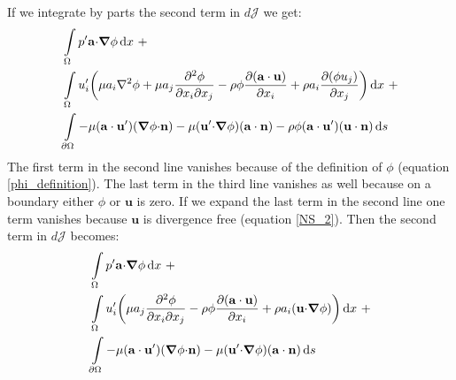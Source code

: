\documentclass[12pt, a4paper]{article}
\begin{document}
If we integrate by parts the second term in $d \mathcal{J}$ we get:
\begin{equation}
\begin{split}
&\int\limits_{\Omega}{p' \mathbf{a \cdot} \boldsymbol{\nabla} \phi} \, \mathrm{d}x \ + \\
&\int\limits_{\Omega}u'_i \bigg{(}
{\mu a_i \nabla^2 \phi} + 
{\mu a_j \frac{\partial^2 \phi}{\partial x_i \partial x_j}}  - 
{\rho \phi \frac{\partial (\mathbf{a \cdot u})}{\partial x_i}} + 
{\rho a_i \frac{\partial (\phi u_j)}{\partial x_j}}
\bigg{)}\, \mathrm{d}x \ + \\
&\int\limits_{\partial \Omega}{-\mu (\mathbf{a \cdot u'}) (\boldsymbol{\nabla} \phi \mathbf{\cdot n})} - 
{\mu (\mathbf{u' \cdot} \boldsymbol{\nabla} \phi) (\mathbf{a \cdot n})} - 
{\rho \phi (\mathbf{a \cdot u'}) (\mathbf{u \cdot n})}
\, \mathrm{d}s
\end{split}
\end{equation}
The first term in the second line vanishes because of the definition of $\phi$ (equation \ref{phi_definition}). The last term in the third line vanishes as well because on a boundary either $\phi$ or $\mathbf{u}$ is zero. If we expand the last term in the second line one term vanishes because $\mathbf{u}$ is divergence free (equation \ref{NS_2}). Then the second term in $d \mathcal{J}$ becomes:
\begin{equation} \label{cost_change_term_2}
\begin{split}
&\int\limits_{\Omega}{p' \mathbf{a \cdot} \boldsymbol{\nabla} \phi} \, \mathrm{d}x \ + \\
&\int\limits_{\Omega}u'_i \bigg{(}
{\mu a_j \frac{\partial^2 \phi}{\partial x_i \partial x_j}}  - 
{\rho \phi \frac{\partial (\mathbf{a \cdot u})}{\partial x_i}} +
{\rho a_i (\mathbf{u \cdot} \boldsymbol{\nabla} \phi)}
\bigg{)}\, \mathrm{d}x \ + \\
&\int\limits_{\partial \Omega}{-\mu (\mathbf{a \cdot u'}) (\boldsymbol{\nabla} \phi \mathbf{\cdot n})} - 
{\mu (\mathbf{u' \cdot} \boldsymbol{\nabla} \phi) (\mathbf{a \cdot n})}
\, \mathrm{d}s
\end{split}
\end{equation}
\end{document}
